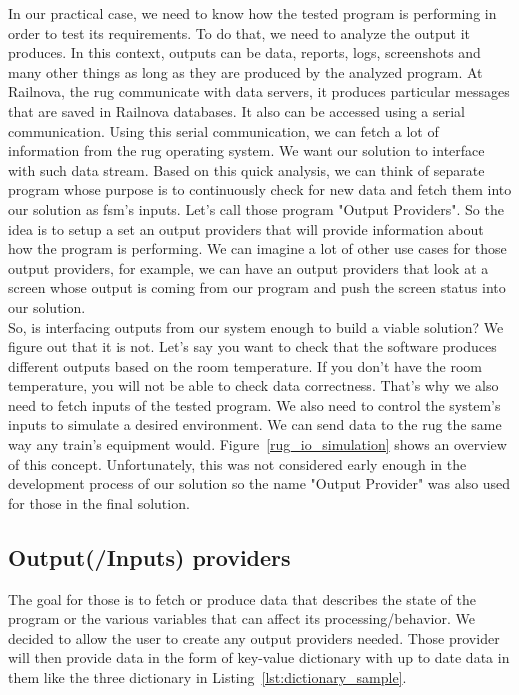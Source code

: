 \documentclass[12pt]{article}
\theoremstyle{definition}
\theoremstyle{definition}
\theoremstyle{remark}
\begin{document}
In our practical case, we need to know how the tested program is performing in order to test its requirements. To do that, we need to analyze the output it produces. In this context, outputs can be data, reports, logs, screenshots and many other things as long as they are produced by the analyzed program. At Railnova, the \gls{rug} communicate with data servers, it produces particular messages that are saved in Railnova databases. It also can be accessed using a serial communication. Using this serial communication, we can fetch a lot of information from the \gls{rug} operating system. We want our solution to interface with such data stream. Based on this quick analysis, we can think of separate program whose purpose is to continuously check for new data and fetch them into our solution as \gls{fsm}'s inputs. Let's call those program "Output Providers". So the idea is to setup a set an output providers that will provide information about how the program is performing. We can imagine a lot of other use cases for those output providers, for example, we can have an output providers that look at a screen whose output is coming from our program and push the screen status into our solution.\\

So, is interfacing outputs from our system enough to build a viable solution? We figure out that it is not. Let's say you want to check that the software produces different outputs based on the room temperature. If you don't have the room temperature, you will not be able to check data correctness. That's why we also need to fetch inputs of the tested program. We also need to control the system's inputs to simulate a desired environment. We can send data to the \gls{rug} the same way any train's equipment would. Figure~\ref{rug_io_simulation} shows an overview of this concept. Unfortunately, this was not considered early enough in the development process of our solution so the name "Output Provider" was also used for those in the final solution.



\subsection{Output(/Inputs) providers}\label{sec:providers}


The goal for those is to fetch or produce data that describes the state of the program or the various variables that can affect its processing/behavior. We decided to allow the user to create any output providers needed. Those provider will then provide data in the form of key-value dictionary with up to date data in them like the three dictionary in Listing~\ref{lst:dictionary_sample}.
\end{document}
